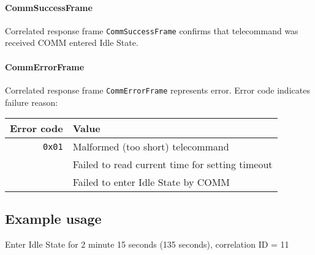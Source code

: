 \paragraph{CommSuccessFrame}
Correlated response frame \texttt{CommSuccessFrame} confirms that telecommand was received COMM entered Idle State.

\paragraph{CommErrorFrame}
Correlated response frame \texttt{CommErrorFrame} represents error. Error code indicates failure reason:

\begin{tabular}{r | l}
	Error code & Value \\
	\hline
	\texttt{0x01} & Malformed (too short) telecommand \\ 
	 			  & Failed to read current time for setting timeout \\
				  & Failed to enter Idle State by COMM
	
\end{tabular}

\subsection{Example usage}
Enter Idle State for 2 minute 15 seconds (135 seconds), correlation ID = 11
